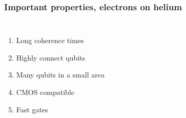 \documentclass{beamer}
\begin{document}
\frame
    {
      \frametitle{Important properties, electrons on helium}

      \begin{footnotesize}
     \begin{columns}
       \column{5.0cm}
\begin{enumerate}
\item Long coherence times

\item Highly connect qubits

\item Many qubits in a small area

\item CMOS compatible

\item Fast gates
\end{enumerate}

\column{6cm}
      \begin{center}
      \end{center}
\end{columns}
      \end{footnotesize}
    }
\end{document}
